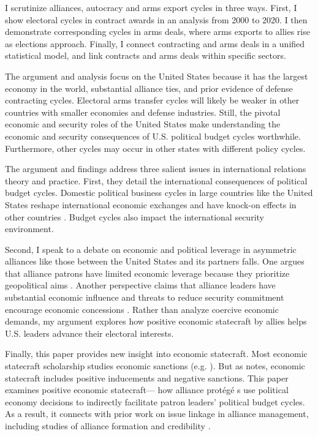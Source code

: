 \documentclass[12pt]{article}
\begin{document}
I scrutinize alliances, autocracy and arms export cycles in three ways. 
First, I show electoral cycles in contract awards in an analysis from 2000 to 2020.
I then demonstrate corresponding cycles in arms deals, where arms exports to allies rise as elections approach. 
Finally, I connect contracting and arms deals in a unified statistical model, and link contracts and arms deals within specific sectors.


The argument and analysis focus on the United States because it has the largest economy in the world, substantial alliance ties, and prior evidence of defense contracting cycles. 
Electoral arms transfer cycles will likely be weaker in other countries with smaller economies and defense industries. 
Still, the pivotal economic and security roles of the United States make understanding the economic and security consequences of U.S. political budget cycles worthwhile.
Furthermore, other cycles may occur in other states with different policy cycles. 


The argument and findings address three salient issues in international relations theory and practice. 
First, they detail the international consequences of political budget cycles. 
Domestic political business cycles in large countries like the United States reshape international economic exchanges and have knock-on effects in other countries \citep{Kayser2006, Kayser2009}.
Budget cycles also impact the international security environment. 


Second, I speak to a debate on economic and political leverage in asymmetric alliances like those between the United States and its partners falls. 
One argues that alliance patrons have limited economic leverage because they prioritize geopolitical aims \citep{Drezner2013, WolfordKim2017}.
Another perspective claims that alliance leaders have substantial economic influence \citep{Norrlof2010, Brooksetal2013} and threats to reduce security commitment encourage economic concessions \citep[pg. 122]{Oatley2015}.
Rather than analyze coercive economic demands, my argument explores how positive economic statecraft by allies helps U.S. leaders advance their electoral interests.


Finally, this paper provides new insight into economic statecraft. 
Most economic statecraft scholarship studies economic sanctions (e.g. \cite{Marinov2005, Allen2008, Escriba-FolchWright2010}).
But as \citet{Baldwin2020} notes, economic statecraft includes positive inducements and negative sanctions. 
This paper examines positive economic statecraft--- how alliance prot{\'e}g{\'e} s use political economy decisions to indirectly facilitate patron leaders' political budget cycles.
As a result, it connects with prior work on issue linkage in alliance management, including studies of alliance formation \citep{Poast2012} and credibility \citep{Davis2008, Poast2013}. 
\end{document}
